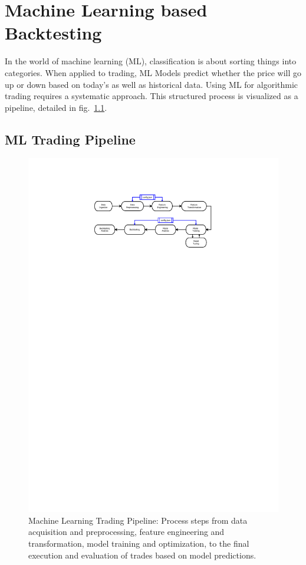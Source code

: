\chapter{Machine Learning based Backtesting}\label{chap:ml_backtesting}

In the world of machine learning (ML), classification is about sorting things into categories.
When applied to trading, ML Models predict whether the price will go up or down based on today's as well as historical data.
Using ML for algorithmic trading requires a systematic approach.
This structured process is visualized as a pipeline, detailed in fig.~\ref{fig:ml_pipeline}.

\section{ML Trading Pipeline} \label{sec:ml_pipeline}


\begin{figure}[H]
\centering
\includegraphics[trim=25mm 220mm 55mm 30mm, width=1.2\textwidth, clip]{./pdf/ml_pipeline.pdf}
\caption{Machine Learning Trading Pipeline: Process steps from data acquisition and preprocessing, feature engineering and transformation, model training and optimization, to the final execution and evaluation of trades based on model predictions.}
\label{fig:ml_pipeline}
\end{figure}

